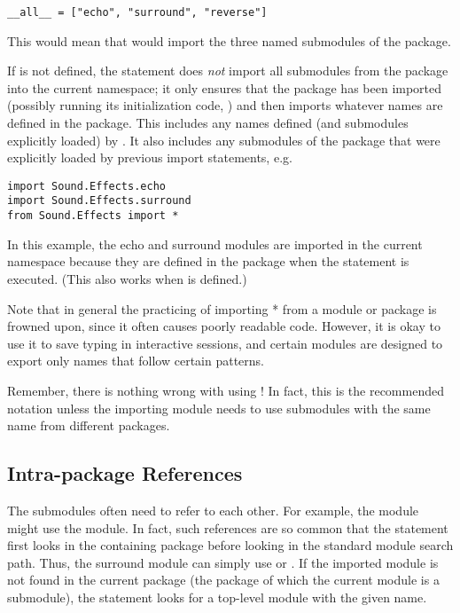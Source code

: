 \documentclass{manual}
\begin{document}
\begin{verbatim}
__all__ = ["echo", "surround", "reverse"]
\end{verbatim}

This would mean that  would
import the three named submodules of the  package.

If  is not defined, the statement  does \emph{not} import all submodules from the package
 into the current namespace; it only ensures that the
package  has been imported (possibly running its
initialization code, ) and then imports whatever names are
defined in the package.  This includes any names defined (and
submodules explicitly loaded) by .  It also includes any
submodules of the package that were explicitly loaded by previous
import statements, e.g.

\begin{verbatim}
import Sound.Effects.echo
import Sound.Effects.surround
from Sound.Effects import *
\end{verbatim}


In this example, the echo and surround modules are imported in the
current namespace because they are defined in the 
package when the  statement is executed.  (This also
works when  is defined.)

Note that in general the practicing of importing * from a module or
package is frowned upon, since it often causes poorly readable code.
However, it is okay to use it to save typing in interactive sessions,
and certain modules are designed to export only names that follow
certain patterns.

Remember, there is nothing wrong with using !  In fact, this is the
recommended notation unless the importing module needs to use
submodules with the same name from different packages.


\subsection{Intra-package References}

The submodules often need to refer to each other.  For example, the
 module might use the  module.  In fact, such references
are so common that the  statement first looks in the
containing package before looking in the standard module search path.
Thus, the surround module can simply use  or
.  If the imported module is not
found in the current package (the package of which the current module
is a submodule), the  statement looks for a top-level module
with the given name.
\end{document}
